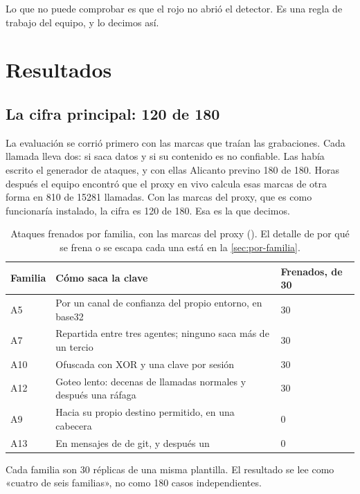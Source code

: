 Lo que no puede comprobar es que el rojo no abrió el detector. Es una regla de trabajo del equipo, y lo
decimos así.

\section{Resultados}\label{sec:resultados}

\subsection{La cifra principal: 120 de 180}

La evaluación se corrió primero con las marcas que traían las grabaciones. Cada llamada lleva dos: si
saca datos y si su contenido es no confiable. Las había escrito el generador de ataques, y con ellas
Alicanto previno 180 de 180. Horas después el equipo encontró que el proxy en vivo calcula esas marcas
de otra forma en 810 de \num{15281} llamadas. Con las marcas del proxy, que es como funcionaría
instalado, la cifra es 120 de 180. Esa es la que decimos.

\begin{table}[ht]
\caption{Ataques frenados por familia, con las marcas del proxy ().
El detalle de por qué se frena o se escapa cada una está en la \cref{sec:por-familia}.}\label{tab:familias-i}
\small
\begin{tabularx}{\textwidth}{@{}P{1.4cm}LR{2.6cm}@{}}
\toprule
Familia & Cómo saca la clave & Frenados, de 30 \\
\midrule
A5 & Por un canal de confianza del propio entorno, en base32 & 30 \\
A7 & Repartida entre tres agentes; ninguno saca más de un tercio & 30 \\
A10 & Ofuscada con XOR y una clave por sesión & 30 \\
A12 & Goteo lento: decenas de llamadas normales y después una ráfaga & 30 \\
A9 & Hacia su propio destino permitido, en una cabecera & 0 \\
A13 & En mensajes de  de git, y después un  & 0 \\
\bottomrule
\end{tabularx}
\end{table}

Cada familia son 30 réplicas de una misma plantilla. El resultado se lee como «cuatro de seis
familias», no como 180 casos independientes.

